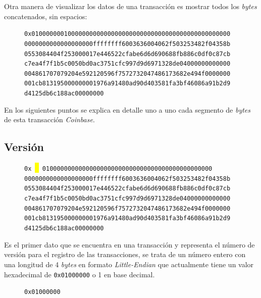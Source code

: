 \documentclass{article}
\newcommand\boxedB[2][1mm]{%
  \savebox\mybox{\ensuremath{\displaystyle\texttt{#2}}}%
  \colorbox{Yellow}{\raisebox{-\dp\mybox-#1}{\rule{0pt}{\ht\mybox+\dp\mybox+#1+#1}}%
    \usebox\mybox}
}
\begin{document}
    Otra manera de visualizar los datos de una transacción es mostrar todos los \textit{bytes} concatenados, sin espacios:
    
    \begin{figure}[H]
        \texttt{0x0100000001000000000000000000000000000000000000000000000} \\
        \texttt{0000000000000000000ffffffff6003636004062f503253482f04358b} \\
        \texttt{0553084404f253000017e446522cfabe6d6d690688fb886c0df0c87cb} \\
        \texttt{c7ea4f7f1b5c0050bd0ac3751cfc997d9d6971328de04000000000000} \\
        \texttt{004861707079204e592120596f7572732047486173682e494f0000000} \\
        \texttt{001cb813195000000001976a91480ad90d403581fa3bf46086a91b2d9} \\
        \texttt{d4125db6c188ac00000000}
    \end{figure}
    
    En los siguientes puntos se explica en detalle uno a uno cada segmento de \textit{bytes} de esta transacción \textit{Coinbase}.
    
    \subsection{Versión}
    
    \begin{figure}[H]
        \texttt{0x\boxedB{01000000}01000000000000000000000000000000000000000000000} \\
        \texttt{0000000000000000000ffffffff6003636004062f503253482f04358b} \\
        \texttt{0553084404f253000017e446522cfabe6d6d690688fb886c0df0c87cb} \\
        \texttt{c7ea4f7f1b5c0050bd0ac3751cfc997d9d6971328de04000000000000} \\
        \texttt{004861707079204e592120596f7572732047486173682e494f0000000} \\
        \texttt{001cb813195000000001976a91480ad90d403581fa3bf46086a91b2d9} \\
        \texttt{d4125db6c188ac00000000}
    \end{figure}
    
    Es el primer dato que se encuentra en una transacción y representa el número de versión para el registro de las transacciones, se trata de un número entero con una longitud de 4 \textit{bytes} en formato \textit{Little-Endian} que actualmente tiene un valor hexadecimal de \texttt{0x01000000} o 1 en base decimal.
    \begin{figure}[H]
        \texttt{0x01000000}
    \end{figure}
    
\end{document}
